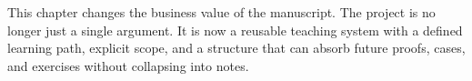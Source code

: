\begin{summarybox}
This chapter changes the business value of the manuscript. The project is no
longer just a single argument. It is now a reusable teaching system with a
defined learning path, explicit scope, and a structure that can absorb future
proofs, cases, and exercises without collapsing into notes.
\end{summarybox}
